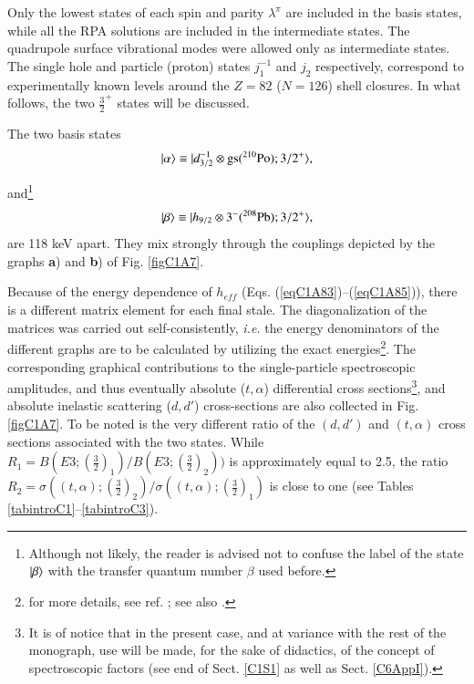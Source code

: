 Only the lowest states of each spin and parity $\lambda^{\pi}$ are included in the basis states, while all the RPA solutions are included in the intermediate states. The quadrupole surface vibrational modes were allowed only as intermediate states. The single hole and particle (proton) states $j_1^{-1}$ and $j_2$ respectively, correspond to experimentally known levels around the $Z = 82$ ($N=126$) shell closures.  
In what follows, the  two $\frac{3}{2}^+$ states will be discussed.

The two basis states 
  \begin{align}\label{eqC1A89} 
   |{\alpha} \rangle\equiv |{d_{3/2}^{-1}\otimes \text{gs}(^{210}\text{Po});3/2^+} \rangle,
    \end{align} 


and\footnote{Although not likely, the reader is advised not to confuse the label of the state $|{\beta} \rangle$ with the transfer quantum number $\beta$ used before.}
  \begin{align}\label{eqC1A90} 
      |{\beta} \rangle\equiv |{h_{9/2}\otimes 3^-(^{208}\text{Pb});3/2^+} \rangle,
    \end{align} 
are 118 keV apart. They mix strongly through the couplings depicted by the graphs \textbf{a}) and \textbf{b}) of Fig. \ref{figC1A7}. 


Because of the energy dependence of $h_{eff}$ (Eqs. (\ref{eqC1A83})--(\ref{eqC1A85})), there is a different matrix element 
for each final stale. The diagonalization of the matrices was carried out self-consistently, \textit{i.e.} the energy denominators of the different graphs are to be calculated by utilizing the exact energies\footnote{for more details, see ref. \cite{Bortignon:77}; see also \cite{Bortignon:76}.}. 
The corresponding graphical contributions to the single-particle spectroscopic amplitudes, and thus eventually absolute ($t,\alpha$) differential cross sections\footnote{It is of notice that in the present case, and at variance with the rest of the monograph, use will be made, for the sake of  didactics, of the concept of spectroscopic factors (see end of Sect. \ref{C1S1} as well as Sect. \ref{C6AppI}).}, and absolute inelastic scattering ($d,d'$) cross-sections are also collected in Fig. \ref{figC1A7}. To be noted is the very different ratio of the $(d,d')$ and $(t,\alpha)$ cross sections associated with the two states. While $R_1=B(E3;(\frac{3}{2})_1)/B(E3;(\frac{3}{2})_2))$ is approximately equal to 2.5, the ratio $R_2=\sigma((t,\alpha);(\frac{3}{2})_2)/\sigma((t,\alpha);(\frac{3}{2})_1)$ is close to one (see Tables \ref{tabintroC1}--\ref{tabintroC3}).


